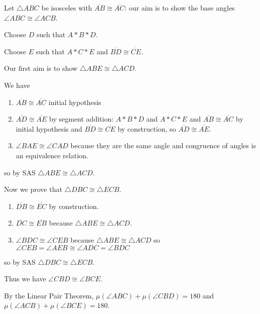 \documentclass[12pt]{article}
\begin{document}
\begin{description}
Let $\triangle ABC$ be isosceles with $\overline{AB} \cong \overline{AC}$:  our aim is to show the base angles $\angle ABC \cong \angle ACB$.

Choose $D$ such that $A*B*D$.

Choose $E$ such that $A*C*E$ and $\overline{BD} \cong \overline{CE}$.

Our first aim is to show $\triangle ABE \cong \triangle ACD$.

We have 

\begin{enumerate}

\item $\overline{AB} \cong \overline{AC}$ initial hypothesis

\item $\overline{AD} \cong \overline{AE}$ by segment addition:  $A*B*D$ and $A*C*E$ and $\overline{AB} \cong \overline{AC}$ by initial hypothesis and $\overline{BD} \cong \overline{CE}$ by construction, so $\overline{AD} \cong \overline{AE}$.

\item $\angle BAE \cong \angle CAD$ because they are the same angle and congruence of angles is an equivalence relation.

\end{enumerate}

so by SAS $\triangle ABE \cong \triangle ACD$.

Now we prove that $\triangle DBC \cong \triangle ECB$.

\begin{enumerate}

\item $\overline{DB} \cong \overline{EC}$ by construction.

\item $\overline{DC} \cong \overline{EB}$ because $\triangle ABE \cong \triangle ACD$.

\item $\angle BDC \cong \angle CEB$ because $\triangle ABE \cong \triangle ACD$ so $\angle CEB = \angle AEB \cong \angle ADC = \angle BDC$

\end{enumerate}

so by SAS  $\triangle DBC \cong \triangle ECB$.

Thus we have $\angle CBD \cong \angle BCE$.

By the Linear Pair Theorem, $\mu(\angle ABC) + \mu(\angle CBD) = 180$ and $\mu(\angle ACB) + \mu(\angle BCE) = 180$.


\end{description}
\end{document}

